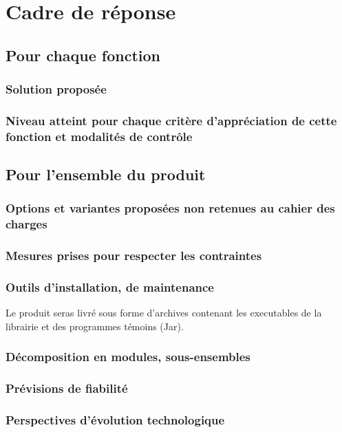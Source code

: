 \section{Cadre de réponse}

\subsection{Pour chaque fonction}

\subsubsection{Solution proposée}
\subsubsection{Niveau atteint pour chaque critère d’appréciation de cette fonction et modalités de contrôle}


\subsection{Pour l’ensemble du produit}

\subsubsection{Options et variantes proposées non retenues au cahier des charges}
\subsubsection{Mesures prises pour respecter les contraintes}

\subsubsection{Outils d’installation, de maintenance}
Le produit seras livré sous forme d'archives contenant les executables de la librairie et des programmes témoins (Jar).


\subsubsection{Décomposition en modules, sous-ensembles}
\subsubsection{Prévisions de fiabilité}
\subsubsection{ Perspectives d’évolution technologique}
